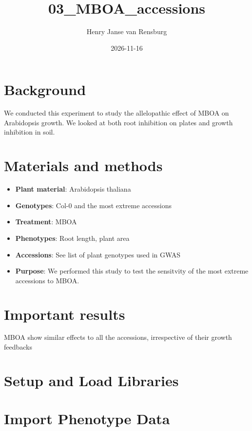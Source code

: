 \documentclass[
  11pt,
]{article}
\title{03\_MBOA\_accessions}
\author{Henry Janse van Rensburg}
\date{2026-11-16}
\renewcommand*\contentsname{Table of contents}
\newcommand\contentsname{Table of contents}
\begin{document}
\maketitle

\renewcommand*\contentsname{Table of contents}
{
\hypersetup{linkcolor=}
\setcounter{tocdepth}{2}
\tableofcontents
}

\section{Background}\label{background}

We conducted this experiment to study the allelopathic effect of MBOA on
Arabidopsis growth. We looked at both root inhibition on plates and
growth inhibition in soil.

\section{Materials and methods}\label{materials-and-methods}

\begin{itemize}
\item
  \textbf{Plant material}: Arabidopsis thaliana
\item
  \textbf{Genotypes}: Col-0 and the most extreme accessions
\item
  \textbf{Treatment}: MBOA
\item
  \textbf{Phenotypes}: Root length, plant area
\item
  \textbf{Accessions}: See list of plant genotypes used in GWAS
\item
  \textbf{Purpose}: We performed this study to test the sensitvity of
  the most extreme accessions to MBOA.
\end{itemize}

\section{Important results}\label{important-results}

MBOA show similar effects to all the accessions, irrespective of their
growth feedbacks

\section{Setup and Load Libraries}\label{setup-and-load-libraries}

\section{Import Phenotype Data}\label{import-phenotype-data}
\end{document}
